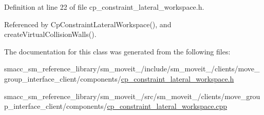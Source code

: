 Definition at line 22 of file cp\+\_\+constraint\+\_\+lateral\+\_\+workspace.\+h.



Referenced by Cp\+Constraint\+Lateral\+Workspace(), and create\+Virtual\+Collision\+Walls().



The documentation for this class was generated from the following files\+:\begin{DoxyCompactItemize}
\item 
smacc\+\_\+sm\+\_\+reference\+\_\+library/sm\+\_\+moveit\+\_/include/sm\+\_\+moveit\+\_/clients/move\+\_\+group\+\_\+interface\+\_\+client/components/\hyperlink{cp__constraint__lateral__workspace_8h}{cp\+\_\+constraint\+\_\+lateral\+\_\+workspace.\+h}\item 
smacc\+\_\+sm\+\_\+reference\+\_\+library/sm\+\_\+moveit\+\_/src/sm\+\_\+moveit\+\_/clients/move\+\_\+group\+\_\+interface\+\_\+client/components/\hyperlink{cp__constraint__lateral__workspace_8cpp}{cp\+\_\+constraint\+\_\+lateral\+\_\+workspace.\+cpp}\end{DoxyCompactItemize}
